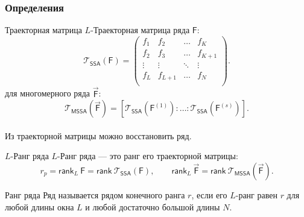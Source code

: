 \documentclass[ucs, notheorems, handout]{beamer}
\newcommand{\rank}{\mathsf{rank}\ }
\newcommand{\Lrank}{\mathsf{rank}_L\ }
\newcommand{\T}{\mathcal{T}}
\newcommand{\F}{\mathsf{F}}
\newcommand{\MF}{\vec{\F}}
\newcommand{\SSA}{\mathsf{SSA}}
\newcommand{\MSSA}{\mathsf{MSSA}}
\begin{document}
\begin{frame}
    \frametitle{Определения}
    \begin{block}{Траекторная матрица}
        $L$-Траекторная матрица ряда $\F$:
        $$\T_{\SSA}(\F) =
        \begin{pmatrix}
            f_1     & f_2    & \dots  & f_{K} \\
            f_2     & f_3    & \dots  & f_{K+1}     \\
            \vdots  & \vdots & \ddots & \vdots  \\
            f_{L} & f_{L+1}    & \dots  & f_{N} \\
        \end{pmatrix}.$$
        для многомерного ряда $\MF$:
        $$\T_{\MSSA}(\MF) = [\T_{\SSA}(\F^{(1)}): \dotso :\T_{\SSA}(\F^{(s)})].$$\\
        Из траекторной матрицы можно восстановить ряд.
    \end{block}

    
\end{frame}

\begin{frame}
    \begin{block}{$L$-Ранг ряда}
        $L$-Ранг ряда --- это ранг его траекторной матрицы: $$r_p =\Lrank \F = \rank \T_{\SSA}(\F),\qquad \Lrank \MF = \rank \T_{\MSSA}(\MF).$$
    \end{block}


    \begin{block}{Ранг ряда}
        Ряд называется рядом конечного ранга $r$, если его $L$-ранг равен $r$ для любой длины окна $L$ и любой достаточно большой длины $N$.
    \end{block}
\end{frame}
\end{document}
